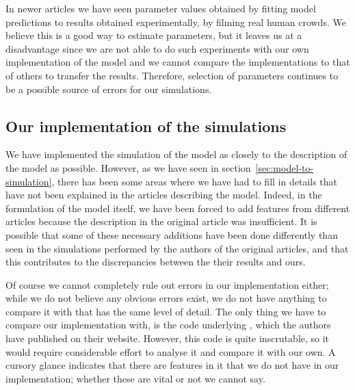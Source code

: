 In newer articles we have seen parameter values obtained by fitting model 
predictions to results obtained experimentally, by filming real human crowds.  
We believe this is a good way to estimate parameters, but it leaves us at a 
disadvantage since we are not able to do such experiments with our own 
implementation of the model and we cannot compare the implementations to that 
of others to transfer the results. Therefore, selection of parameters 
continues to be a possible source of errors for our simulations.

\subsection{Our implementation of the simulations}
\label{sec:random-errors}
We have implemented the simulation of the model as closely to 
the description of the model as possible. However, as we have seen in 
section~\ref{sec:model-to-simulation}, there has been some areas where we have 
had to fill in details that have not been explained in the articles 
describing the model. Indeed, in the formulation of the model itself, we have 
been forced to add features from different articles because the description in 
the original article was insufficient. It is possible that some of these 
necessary additions have been done differently than seen in the simulations 
performed by the authors of the original articles, and that this contributes 
to the discrepancies between the their results and ours.

Of course we cannot completely rule out errors in our implementation either; 
while we do not believe any obvious errors exist, we do not have anything to 
compare it with that has the same level of detail. The only thing we have to 
compare our implementation with, is the code underlying \cite{helbing00}, 
which the authors have published on their website. However, this code is quite 
inscrutable, so it would require considerable effort to analyse it and compare 
it with our own. A cursory glance indicates that there are features in it that 
we do not have in our implementation; whether these are vital or not we cannot 
say.

